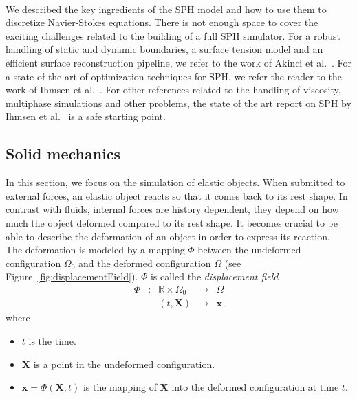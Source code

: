 \\
We described the key ingredients of the SPH model and how to use them to discretize Navier-Stokes equations. 
There is not enough space to cover the exciting challenges related to the building of a full SPH simulator. 
For a robust handling of static and dynamic boundaries, a surface tension model and an efficient surface reconstruction pipeline, we refer to the work of Akinci et al.~\cite{Akinci2012b, Akinci2013, Akinci2012a}.  
For a state of the art of optimization techniques for SPH, we refer the reader to the work of Ihmsen et al.~\cite{Ihmsen2011:ParallelSPH}. 
For other references related to the handling of viscosity, multiphase simulations and other problems, the state of the art report on SPH by Ihmsen et al.~\cite{Ihmsen2014:STAR} is a safe starting point.

\subsection{Solid mechanics}
\label{subsec:solidMechanics}
In this section, we focus on the simulation of elastic objects. When submitted to external forces, an elastic object reacts so that it comes back to its rest shape. In contrast with fluids, internal forces are history dependent, they depend on how much the object deformed compared to its rest shape. It becomes crucial to be able to describe the deformation of an object in order to express its reaction. 
\\
The deformation is modeled by a mapping $\Phi$ between the undeformed configuration $\Omega_{0}$ and the deformed configuration $\Omega$ (see Figure~\ref{fig:displacementField}). $\Phi$ is called the \emph{displacement field}
\begin{equation}
\begin{array}{lllll}
\Phi & : & \mathbb{R} \times \Omega_{0} & \longrightarrow & \Omega \\
	 &  & \left(t, \mathbf{X}\right) & \longrightarrow & \mathbf{x}
\end{array}
\end{equation}
where 
\begin{itemize}
\item $t$ is the time.
\item $\mathbf{X}$ is a point in the undeformed configuration.
\item $\mathbf{x}=\Phi(\mathbf{X},t)$ is the mapping of $\mathbf{X}$ into the deformed configuration at time $t$.
\end{itemize}
